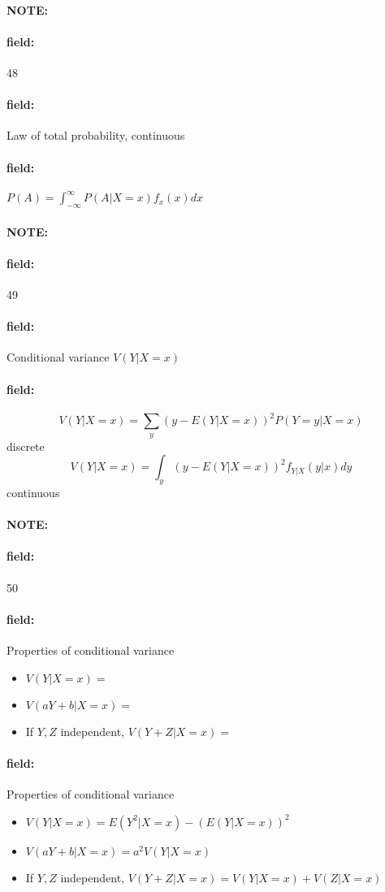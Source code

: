 \documentclass[12pt]{article}
\newenvironment{note}{\paragraph{NOTE:}}{}
\newenvironment{field}{\paragraph{field:}}{}
\begin{document}
\begin{note}
  \begin{field}
    \tiny 48
  \end{field}
  \begin{field}
    Law of total probability, continuous
  \end{field}
  \begin{field}
    $P(A) = \int_{-\infty}^\infty P(A|X=x)f_x(x)dx$
  \end{field}
\end{note}

\begin{note}
  \begin{field}
  \tiny 49
\end{field}
  \begin{field}
    Conditional variance $V(Y|X = x)$
  \end{field}
  \begin{field}
    $$V(Y|X = x) = \sum_y (y - E(Y|X=x))^2P(Y=y|X=x)$$ discrete
    $$V(Y|X = x) = \int_y (y - E(Y|X=x))^2 f_{Y|X}(y|x)dy$$ continuous
  \end{field}
\end{note}

\begin{note}
  \begin{field}
    \tiny 50
  \end{field}
  \begin{field}
    Properties of conditional variance
    \begin{itemize}
      \item $V(Y|X=x) = $
      \item $V(aY + b | X = x) = $
      \item If $Y,Z$ independent, $V(Y+Z | X=x) = $
    \end{itemize}
  \end{field}
  \begin{field}
    Properties of conditional variance
    \begin{itemize}
      \item $V(Y|X=x) = E(Y^2 | X=x) - (E(Y|X=x))^2$
      \item $V(aY + b | X = x) = a^2 V(Y|X=x)$
      \item If $Y,Z$ independent, $V(Y+Z | X=x) = V(Y|X=x) + V(Z|X=x)$
    \end{itemize}
  \end{field}
\end{note}

\end{document}
